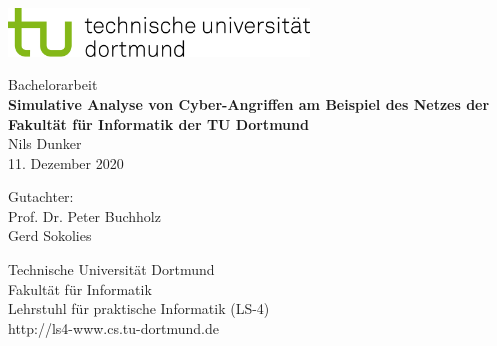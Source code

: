 \begin{titlepage}
	\vspace*{-2cm}
	\newlength{\links}
	\setlength{\links}{-1.5cm}
	\sffamily
	\hspace*{\links}
	\begin{minipage}{12.5cm}
		\includegraphics[width=8cm]{pic/tud_logo_rgb}
	\end{minipage}
	
	\vspace*{4cm}
	
	\hspace*{\links}
	\hspace*{-0.2cm}
	\begin{minipage}{9cm}
		\large
		\begin{center}
			{\Large Bachelorarbeit} \\
			\vspace*{1cm}
			\textbf{Simulative Analyse von Cyber-Angriffen am Beispiel des Netzes der Fakultät für Informatik der TU Dortmund} \\
			\vspace*{1cm}
			Nils Dunker\\
			11. Dezember 2020
		\end{center}
	\end{minipage}
	\normalsize
	\vspace*{5.5cm}
	
	
	\vspace*{2.1cm}
	
	\hspace*{\links}
	\begin{minipage}[b]{5cm}
		\raggedright
		Gutachter: \\
		Prof. Dr. Peter Buchholz \\
		Gerd Sokolies \\
	\end{minipage}
	
	\vspace*{2.5cm}
	\hspace*{\links}
	\begin{minipage}[b]{8cm}
		\raggedright
		Technische Universität Dortmund \\
		Fakultät für Informatik\\
		Lehrstuhl für praktische Informatik (LS-4)\\
		http://ls4-www.cs.tu-dortmund.de
	\end{minipage}

	
\end{titlepage}
